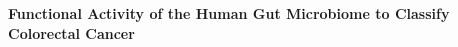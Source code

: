 \documentclass[11pt]{article}
\begin{document}
\sloppy
\begin{center}
\large{\textbf{
    Functional Activity of the Human Gut Microbiome to Classify Colorectal Cancer
}}
\end{center}



%
%
\end{document}
